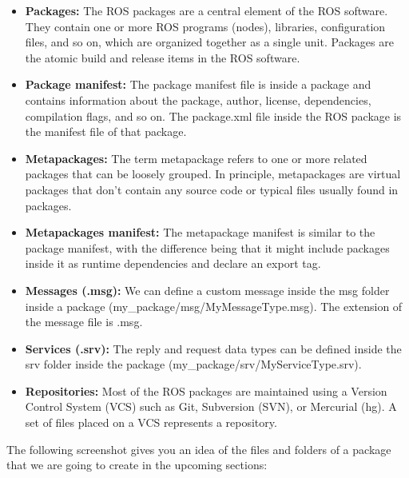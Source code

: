\documentclass[../../main]{subfiles}
\begin{document}
\begin{itemize}
\item  \textbf{Packages:} The ROS packages are a central element of the ROS software. They
    contain one or more ROS programs (nodes), libraries, configuration files, and so
    on, which are organized together as a single unit. Packages are the atomic build and
    release items in the ROS software.
\item  \textbf{Package manifest:} The package manifest file is inside a package and contains
    information about the package, author, license, dependencies, compilation flags,
    and so on. The package.xml file inside the ROS package is the manifest file of
    that package.
\item  \textbf{Metapackages:} The term metapackage refers to one or more related packages that
    can be loosely grouped. In principle, metapackages are virtual packages that don't
    contain any source code or typical files usually found in packages.
\item  \textbf{Metapackages manifest:} The metapackage manifest is similar to the package
    manifest, with the difference being that it might include packages inside it as
    runtime dependencies and declare an export tag.
\item  \textbf{Messages (.msg):} We can define a custom message inside the msg folder inside
    a package (my\_package/msg/MyMessageType.msg). The extension of the
    message file is .msg.
\item  \textbf{Services (.srv):} The reply and request data types can be defined inside the srv
    folder inside the package (my\_package/srv/MyServiceType.srv).
\item  \textbf{Repositories:} Most of the ROS packages are maintained using a Version Control
    System (VCS) such as Git, Subversion (SVN), or Mercurial (hg). A set of files
    placed on a VCS represents a repository.
\end{itemize}
The following screenshot gives you an idea of the files and folders of a package that we are
going to create in the upcoming sections:
\end{document}
